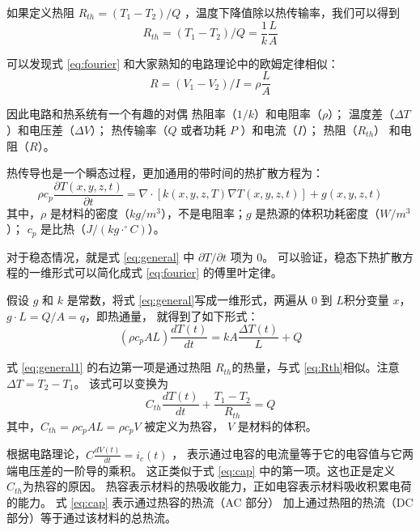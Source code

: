 如果定义热阻 $R_{th} = (T_1 -T_2)/Q$ ，温度下降值除以热传输率，我们可以得到
\begin{equation}\label{eq:Rth}
R_{th} = (T_1-T_2)/Q = \frac{1}{k}\frac{L}{A}
\end{equation}

可以发现式 \eqref{eq:fourier} 和大家熟知的电路理论中的欧姆定律相似：
\begin{equation}\label{eq:Ohm}
R = (V_1-V_2)/I = \rho \frac{L}{A}
\end{equation}

因此电路和热系统有一个有趣的对偶 \raisebox{0.5mm}{------}热阻率（$1/k$）和电阻率（$\rho$）；
温度差（$\Delta T$）和电压差（$\Delta V$）；
热传输率（$Q$ 或者功耗 $P$ ）和电流（$I$）；
热阻（$R_{th}$） 和电阻（$R$）。

热传导也是一个瞬态过程，更加通用的带时间的热扩散方程为：
\begin{equation}\label{eq:general}
 \rho c_p \frac{\partial T(x,y,z,t)}{\partial t} = \nabla \cdot[k(x,y,z,T)\nabla T(x,y,z,t)] +g(x,y,z,t)
\end{equation}
其中，$\rho$ 是材料的密度（$kg/m^3$），不是电阻率；$g$ 是热源的体积功耗密度（$W/m^3$）；
$c_p$ 是比热（$J/(kg \cdot ^\circ C)$）。

对于稳态情况，就是式 \eqref{eq:general} 中 $\partial T/\partial t $ 项为 0。
可以验证，稳态下热扩散方程的一维形式可以简化成式 \eqref{eq:fourier} 的傅里叶定律。

假设 $g$ 和 $k$ 是常数，将式 \eqref{eq:general}写成一维形式，两遍从 $0$ 到 $L$积分变量 $x$，$g\cdot L = Q/A = q$，即热通量， 就得到了如下形式：
\begin{equation}\label{eq:general1}
 (\rho c_p A L) \frac{d T(t)}{d t} = k A \frac{\Delta T(t)}{L} + Q
\end{equation}

式 \eqref{eq:general1} 的右边第一项是通过热阻 $R_{th}$的热量，与式 \eqref{eq:Rth}相似。注意$\Delta T = T_2 - T_1$。
该式可以变换为
\begin{equation}\label{eq:cap}
 C_{th} \frac{d T(t)}{d t} + \frac{ T_1 -T_2}{R_{th}} = Q
\end{equation}
其中，$C_{th} = \rho c_p A L = \rho c_p V $ 被定义为热容， $V$ 是材料的体积。

根据电路理论，$ C  \frac{d V(t)}{d t} = i_c(t)$ ， 表示通过电容的电流量等于它的电容值与它两端电压差的一阶导的乘积。
这正类似于式 \eqref{eq:cap} 中的第一项。这也正是定义 $C_{th}$为热容的原因。
热容表示材料的热吸收能力，正如电容表示材料吸收积累电荷的能力。
式 \eqref{eq:cap} 表示通过热容的热流（AC 部分） 加上通过热阻的热流（DC 部分）等于通过该材料的总热流。

